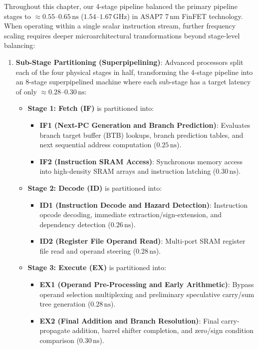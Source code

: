 Throughout this chapter, our 4-stage pipeline balanced the primary pipeline stages to $\approx 0.55\text{--}0.65\,\text{ns}$ ($1.54\text{--}1.67\,\text{GHz}$) in ASAP7 7\,nm FinFET technology. When operating within a single scalar instruction stream, further frequency scaling requires deeper microarchitectural transformations beyond stage-level balancing:
\begin{enumerate}
    \item \textbf{Sub-Stage Partitioning (Superpipelining)}:
    Advanced processors split each of the four physical stages in half, transforming the 4-stage pipeline into an 8-stage superpipelined machine where each sub-stage has a target latency of only $\approx 0.28\text{--}0.30\,\text{ns}$:
    \begin{itemize}
        \item \textbf{Stage 1: Fetch (IF)} is partitioned into:
        \begin{itemize}
            \item \textbf{IF1 (Next-PC Generation and Branch Prediction)}: Evaluates branch target buffer (BTB) lookups, branch prediction tables, and next sequential address computation ($0.25\,\text{ns}$).
            \item \textbf{IF2 (Instruction SRAM Access)}: Synchronous memory access into high-density SRAM arrays and instruction latching ($0.30\,\text{ns}$).
        \end{itemize}
        \item \textbf{Stage 2: Decode (ID)} is partitioned into:
        \begin{itemize}
            \item \textbf{ID1 (Instruction Decode and Hazard Detection)}: Instruction opcode decoding, immediate extraction/sign-extension, and dependency detection ($0.26\,\text{ns}$).
            \item \textbf{ID2 (Register File Operand Read)}: Multi-port SRAM register file read and operand steering ($0.28\,\text{ns}$).
        \end{itemize}
        \item \textbf{Stage 3: Execute (EX)} is partitioned into:
        \begin{itemize}
            \item \textbf{EX1 (Operand Pre-Processing and Early Arithmetic)}: Bypass operand selection multiplexing and preliminary speculative carry/sum tree generation ($0.28\,\text{ns}$).
            \item \textbf{EX2 (Final Addition and Branch Resolution)}: Final carry-propagate addition, barrel shifter completion, and zero/sign condition comparison ($0.30\,\text{ns}$).

\end{itemize}
\end{itemize}
\end{enumerate}
